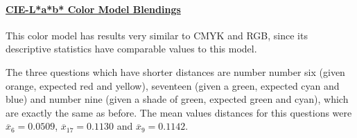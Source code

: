 \paragraph{\ul{CIE-L*a*b* Color Model Blendings}} \par
\label{par:labcolormodel}
%
This color model has results very similar to CMYK and RGB, since its descriptive statistics have comparable values to this model. \par
%
The three questions which have shorter distances are number number six (given orange, expected red and yellow), seventeen (given a green, expected cyan and blue) and number nine (given a shade
of green, expected green and cyan), which are exactly the same as before. The mean values distances for this questions were $\overline{x}_{6} = 0.0509$, $\overline{x}_{17} = 0.1130$ and $\overline{x}_{9} = 0.1142$. \par
%

